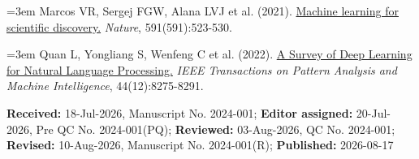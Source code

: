 \documentclass[11pt,a4paper]{article}
\newcommand{\referencefont}{\fontsize{9}{11}\selectfont}
\begin{document}
\vspace{0.2em}

{\referencefont
    \noindent\hangindent=3em
            Marcos VR, Sergej FGW, Alana LVJ et al.
        (2021).
            \href{https://pubmed.ncbi.nlm.nih.gov/33753790/}{Machine learning for scientific discovery.}
        \textit{Nature},
            591(591):523-530.
    
    \noindent\hangindent=3em
            Quan L, Yongliang S, Wenfeng C et al.
        (2022).
            \href{https://ieeexplore.ieee.org/abstract/document/9530071/}{A Survey of Deep Learning for Natural Language Processing.}
        \textit{IEEE Transactions on Pattern Analysis and Machine Intelligence},
            44(12):8275-8291.
    
}

\vfill
\noindent
\begin{framed}
\fontsize{8}{10}\selectfont
\noindent
\textbf{Received:} 18-Jul-2026, Manuscript No. 2024-001;
\textbf{Editor assigned:} 20-Jul-2026, Pre QC No. 2024-001(PQ);
\textbf{Reviewed:} 03-Aug-2026, QC No. 2024-001;
\textbf{Revised:} 10-Aug-2026, Manuscript No. 2024-001(R);
\textbf{Published:} 2026-08-17
\end{framed}
\end{document}
